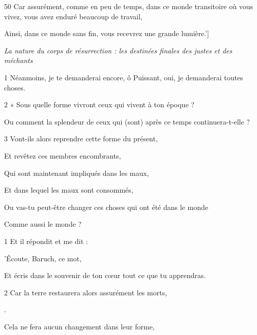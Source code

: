 \par 50 Car assurément, comme en peu de temps, dans ce monde transitoire où vous vivez, vous avez enduré beaucoup de travail,

\par Ainsi, dans ce monde sans fin, vous recevrez une grande lumière.']


\par \textit{La nature du corps de résurrection : les destinées finales des justes et des méchants}

\par 1 Néanmoins, je te demanderai encore, ô Puissant, oui, je demanderai toutes choses.

\par 2 « Sous quelle forme vivront ceux qui vivent à ton époque ?

\par Ou comment la splendeur de ceux qui (sont) après ce temps continuera-t-elle ?

\par 3 Vont-ils alors reprendre cette forme du présent,

\par Et revêtez ces membres encombrants,

\par Qui sont maintenant impliqués dans les maux,

\par Et dans lequel les maux sont consommés,

\par Ou vas-tu peut-être changer ces choses qui ont été dans le monde

\par Comme aussi le monde ?


\par 1 Et il répondit et me dit :

\par 'Écoute, Baruch, ce mot,

\par Et écris dans le souvenir de ton cœur tout ce que tu apprendras.

\par 2 Car la terre restaurera alors assurément les morts,

\par [Qu'il reçoit maintenant, afin de les conserver].

\par Cela ne fera aucun changement dans leur forme,

